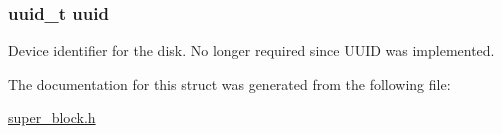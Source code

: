 \hypertarget{structsuperblock_a0c9cfc131b27ae3b98b1533bba4c58ef}{
\subsubsection[{uuid}]{\setlength{\rightskip}{0pt plus 5cm}uuid\-\_\-t uuid}}\label{structsuperblock_a0c9cfc131b27ae3b98b1533bba4c58ef}
Device identifier for the disk. No longer required since U\-U\-I\-D was implemented. 

The documentation for this struct was generated from the following file\-:\begin{DoxyCompactItemize}
\item 
\hyperlink{super__block_8h}{super\-\_\-block.\-h}\end{DoxyCompactItemize}
